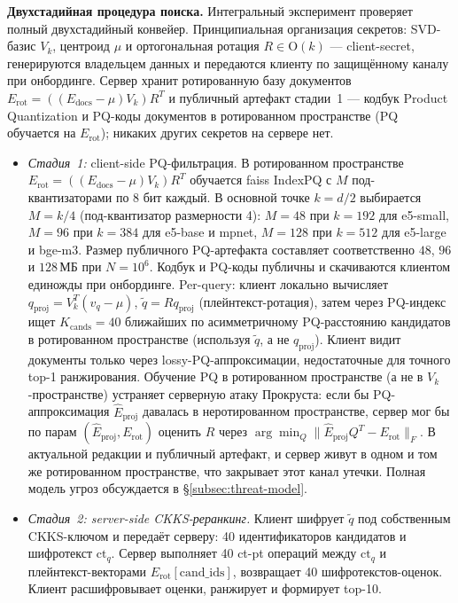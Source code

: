 \documentclass[a4paper, 12pt, oneside, openany]{article}
\begin{document}
\textbf{Двухстадийная процедура поиска.} Интегральный эксперимент проверяет полный двухстадийный конвейер. Принципиальная организация секретов: SVD-базис $V_k$, центроид $\mu$ и ортогональная ротация $R \in \mathrm{O}(k)$ --- client-secret, генерируются владельцем данных и передаются клиенту по защищённому каналу при онбординге. Сервер хранит ротированную базу документов $E_{\mathrm{rot}} = ((E_{\mathrm{docs}} - \mu) V_k) R^{T}$ и публичный артефакт стадии~1 --- кодбук Product Quantization и PQ-коды документов в ротированном пространстве (PQ обучается на $E_{\mathrm{rot}}$); никаких других секретов на сервере нет.
\begin{itemize}
	\item \emph{Стадия~1:} client-side PQ-фильтрация. В ротированном пространстве $E_{\mathrm{rot}} = ((E_{\mathrm{docs}} - \mu) V_k) R^{T}$ обучается faiss IndexPQ с $M$ под-квантизаторами по 8 бит каждый. В основной точке $k = d/2$ выбирается $M = k/4$ (под-квантизатор размерности 4): $M = 48$ при $k = 192$ для e5-small, $M = 96$ при $k = 384$ для e5-base и mpnet, $M = 128$ при $k = 512$ для e5-large и bge-m3. Размер публичного PQ-артефакта составляет соответственно $48$, $96$ и $128$\,МБ при $N = 10^6$. Кодбук и PQ-коды публичны и скачиваются клиентом единожды при онбординге. Per-query: клиент локально вычисляет $q_{\mathrm{proj}} = V_k^{T}(v_q - \mu)$, $\tilde q = R q_{\mathrm{proj}}$ (плейнтекст-ротация), затем через PQ-индекс ищет $K_{\mathrm{cands}} = 40$ ближайших по асимметричному PQ-расстоянию кандидатов в ротированном пространстве (используя $\tilde q$, а не $q_{\mathrm{proj}}$). Клиент видит документы только через lossy-PQ-аппроксимации, недостаточные для точного top-1 ранжирования. Обучение PQ в ротированном пространстве (а не в $V_k$-пространстве) устраняет серверную атаку Прокруста: если бы PQ-аппроксимация $\hat{E}_{\mathrm{proj}}$ давалась в неротированном пространстве, сервер мог бы по парам $(\hat{E}_{\mathrm{proj}}, E_{\mathrm{rot}})$ оценить $R$ через $\arg\min_Q \|\hat{E}_{\mathrm{proj}} Q^T - E_{\mathrm{rot}}\|_F$. В актуальной редакции и публичный артефакт, и сервер живут в одном и том же ротированном пространстве, что закрывает этот канал утечки. Полная модель угроз обсуждается в §\ref{subsec:threat-model}.
	\item \emph{Стадия~2: server-side CKKS-реранкинг.} Клиент шифрует $\tilde q$ под собственным CKKS-ключом и передаёт серверу: 40 идентификаторов кандидатов и шифротекст $\mathrm{ct}_q$. Сервер выполняет 40 ct-pt операций между $\mathrm{ct}_q$ и плейнтекст-векторами $E_{\mathrm{rot}}[\mathrm{cand\_ids}]$, возвращает 40 шифротекстов-оценок. Клиент расшифровывает оценки, ранжирует и формирует top-10.
\end{itemize}
\end{document}
